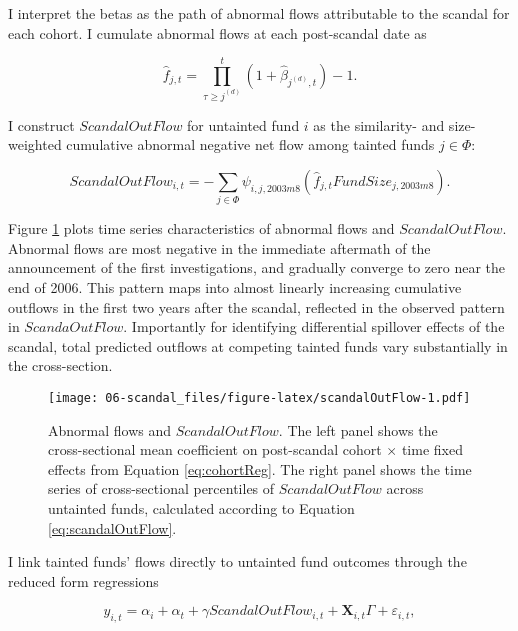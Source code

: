 \documentclass[openany]{book}
\theoremstyle{definition}
\theoremstyle{definition}
\theoremstyle{definition}
\theoremstyle{remark}
\begin{document}
I interpret the betas as the path of abnormal flows attributable to the
scandal for each cohort. I cumulate abnormal flows at each post-scandal
date as

\begin{equation}
\hat{f}_{j,t} = \prod_{\tau\geq j^{(d)}}^t \left(1+\hat{\beta}_{j^{(d)},t}\right) - 1.
\end{equation}

I construct \(ScandalOutFlow\) for untainted fund \(i\) as the
similarity- and size-weighted cumulative abnormal negative net flow
among tainted funds \(j\in\Phi\):

\begin{equation}
ScandalOutFlow_{i,t}= -\sum_{j\in \Phi} \psi_{i,j,2003m8} \left(\hat{f}_{j,t} FundSize_{j,2003m8} \right).
\label{eq:scandalOutFlow}
\end{equation}

Figure \ref{fig:scandalOutFlow} plots time series characteristics of
abnormal flows and \(ScandalOutFlow\). Abnormal flows are most negative
in the immediate aftermath of the announcement of the first
investigations, and gradually converge to zero near the end of 2006.
This pattern maps into almost linearly increasing cumulative outflows in
the first two years after the scandal, reflected in the observed pattern
in \(ScandaOutFlow\). Importantly for identifying differential spillover
effects of the scandal, total predicted outflows at competing tainted
funds vary substantially in the cross-section.

\begin{figure}
\centering
\texttt{[image: 06-scandal\_files/figure-latex/scandalOutFlow-1.pdf]}
\caption{\label{fig:scandalOutFlow}Abnormal flows and \(ScandalOutFlow\).
The left panel shows the cross-sectional mean coefficient on
post-scandal cohort \(\times\) time fixed effects from Equation
\eqref{eq:cohortReg}. The right panel shows the time series of
cross-sectional percentiles of \(ScandalOutFlow\) across untainted
funds, calculated according to Equation \eqref{eq:scandalOutFlow}.}
\end{figure}

I link tainted funds' flows directly to untainted fund outcomes through
the reduced form regressions

\begin{equation}
    y_{i,t}=\alpha_i+\alpha_t+\gamma ScandalOutFlow_{i,t} + \mathbf{X}_{i,t}\Gamma + \varepsilon_{i,t},
\end{equation}
\end{document}
